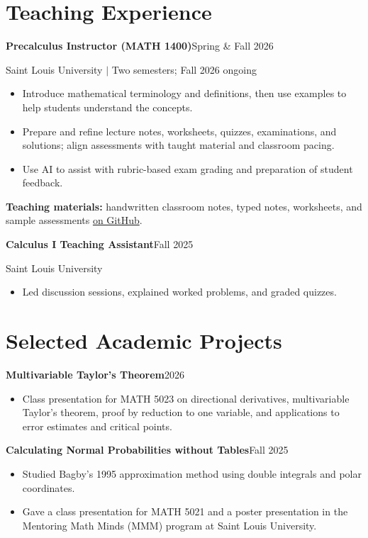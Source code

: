 \documentclass[10pt,letterpaper]{article}
\newcommand{\entry}[3]{\par\textbf{#1}\hfill #2\par#3\par}
\begin{document}
\section*{Teaching Experience}
\entry{Precalculus Instructor (MATH 1400)}{Spring \& Fall 2026}{Saint Louis University $\vert$ Two semesters; Fall 2026 ongoing}
\begin{itemize}
\item Introduce mathematical terminology and definitions, then use examples to help students understand the concepts.
\item Prepare and refine lecture notes, worksheets, quizzes, examinations, and solutions; align assessments with taught material and classroom pacing.
\item Use AI to assist with rubric-based exam grading and preparation of student feedback.
\end{itemize}
\textbf{Teaching materials:} handwritten classroom notes, typed notes, worksheets, and sample assessments \href{https://github.com/Walter-Li17/academic-projects/tree/main/teaching}{on GitHub}.\par
\entry{Calculus I Teaching Assistant}{Fall 2025}{Saint Louis University}
\begin{itemize}
\item Led discussion sessions, explained worked problems, and graded quizzes.
\end{itemize}

\section*{Selected Academic Projects}
\entry{Multivariable Taylor's Theorem}{2026}{}
\begin{itemize}
\item Class presentation for MATH 5023 on directional derivatives, multivariable Taylor's theorem, proof by reduction to one variable, and applications to error estimates and critical points.
\end{itemize}
\entry{Calculating Normal Probabilities without Tables}{Fall 2025}{}
\begin{itemize}
\item Studied Bagby's 1995 approximation method using double integrals and polar coordinates.
\item Gave a class presentation for MATH 5021 and a poster presentation in the Mentoring Math Minds (MMM) program at Saint Louis University.
\end{itemize}
\end{document}
